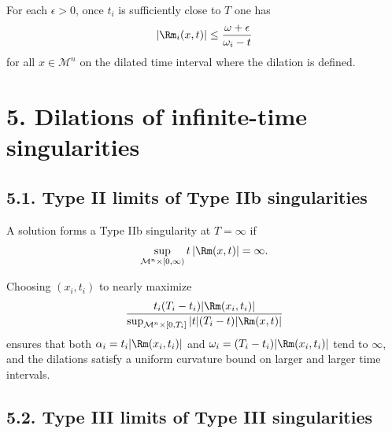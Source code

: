 \begin{remark}
\label{ch08-rem-type-i-curvature-bound-after-rescaling}

For each \(\epsilon>0\), once \(t_i\) is sufficiently close to \(T\) one has
\[
|\Rm_i(x,t)|\le \frac{\omega+\epsilon}{\omega_i-t}
\]
for all \(x\in\mathcal M^n\) on the dilated time interval where the dilation is defined.
\end{remark}

\section*{5. Dilations of infinite-time singularities}

\subsection*{5.1. Type II limits of Type IIb singularities}

\begin{remark}
\label{ch08-rem-type-iib-condition}

A solution forms a Type IIb singularity at \(T=\infty\) if
\[
\sup_{\mathcal M^n\times[0,\infty)} t\,|\Rm(x,t)|=\infty.
\]
\end{remark}

\begin{remark}
\label{ch08-rem-refined-type-iib-rescaling}

Choosing \((x_i,t_i)\) to nearly maximize
\[
\frac{t_i(T_i-t_i)|\Rm(x_i,t_i)|}{\sup_{\mathcal M^n\times[0,T_i]}|t|(T_i-t)|\Rm(x,t)|}
\]
ensures that both \(\alpha_i=t_i|\Rm(x_i,t_i)|\) and \(\omega_i=(T_i-t_i)|\Rm(x_i,t_i)|\) tend to \(\infty\), and the dilations satisfy a uniform curvature bound on larger and larger time intervals.
\end{remark}

\subsection*{5.2. Type III limits of Type III singularities}

